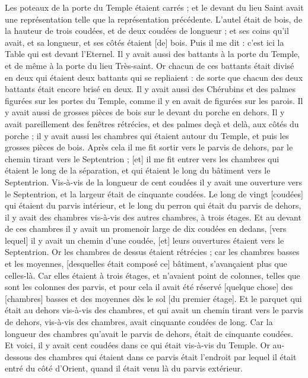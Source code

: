 \begin{multicols}{2}
Les poteaux de la porte du Temple étaient carrés ; et le devant du lieu Saint avait une représentation telle que la représentation précédente.
L'autel était de bois, de la hauteur de trois coudées, et de deux coudées de longueur ; et ses coins qu'il avait, et sa longueur, et ses côtés étaient [de] bois. Puis il me dit : c'est ici la Table qui est devant l'Eternel.
Il y avait aussi des battants à la porte du Temple, et de même à la porte du lieu Très-saint.
Or chacun de ces battants était divisé en deux qui étaient deux battants qui se repliaient : de sorte que chacun des deux battants était encore brisé en deux.
Il y avait aussi des Chérubins et des palmes figurées sur les portes du Temple, comme il y en avait de figurées sur les parois. Il y avait aussi de grosses pièces de bois sur le devant du porche en dehors.
Il y avait pareillement des fenêtres rétrécies, et des palmes deçà et delà, aux côtés du porche ; il y avait aussi les chambres qui étaient autour du Temple, et puis les grosses pièces de bois.
\VerseOne{}Après cela il me fit sortir vers le parvis de dehors, par le chemin tirant vers le Septentrion ; [et] il me fit entrer vers les chambres qui étaient le long de la séparation, et qui étaient le long du bâtiment vers le Septentrion.
Vis-à-vis de la longueur de cent coudées il y avait une ouverture vers le Septentrion, et la largeur était de cinquante coudées.
Le long de vingt [coudées] qui étaient du parvis intérieur, et le long du perron qui était du parvis de dehors, il y avait des chambres vis-à-vis des autres chambres, à trois étages.
Et au devant de ces chambres il y avait un promenoir large de dix coudées en dedans, [vers lequel] il y avait un chemin d'une coudée, [et] leurs ouvertures étaient vers le Septentrion.
Or les chambres de dessus étaient rétrécies ; car les chambres basses et les moyennes, [desquelles était composé ce] bâtiment, s'avançaient plus que celles-là.
Car elles étaient à trois étages, et n'avaient point de colonnes, telles que sont les colonnes des parvis, et pour cela il avait été réservé [quelque chose] des [chambres] basses et des moyennes dès le sol [du premier étage].
Et le parquet qui était au dehors vis-à-vis des chambres, et qui avait un chemin tirant vers le parvis de dehors, vis-à-vis des chambres, avait cinquante coudées de long.
Car la longueur des chambres qu'avait le parvis de dehors, était de cinquante coudées. Et voici, il y avait cent coudées dans ce qui était vis-à-vis du Temple.
Or au-dessous des chambres qui étaient dans ce parvis était l'endroit par lequel il était entré du côté d'Orient, quand il était venu là du parvis extérieur.

\end{multicols}
